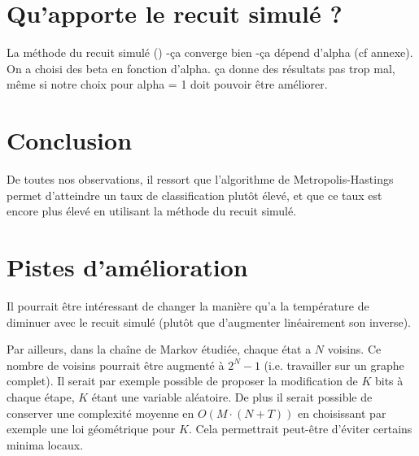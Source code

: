\documentclass[twocolumn]{article}
\begin{document}
	\section{Qu'apporte le recuit simulé ?}
		La méthode du recuit simulé ()
		-ça converge bien
		-ça dépend d'alpha (cf annexe). On a choisi des beta en fonction d'alpha. ça donne des résultats pas trop mal, même si notre choix pour alpha = 1 doit pouvoir être améliorer.
		
	\section{Conclusion}
		De toutes nos observations, il ressort que l'algorithme de Metropolis-Hastings permet d'atteindre un taux de classification plutôt élevé, et que ce taux est encore plus élevé en utilisant la méthode du recuit simulé.
		
	\section{Pistes d'amélioration}
		Il pourrait être intéressant de changer la manière qu'a la température de diminuer avec le recuit simulé (plutôt que d'augmenter linéairement son inverse).
		
		Par ailleurs, dans la chaîne de Markov étudiée, chaque état a $N$ voisins. Ce nombre de voisins pourrait être augmenté à $2^N-1$ (i.e. travailler sur un graphe complet). Il serait par exemple possible de proposer la modification de $K$ bits à chaque étape, $K$ étant une variable aléatoire. De plus il serait possible de conserver une complexité moyenne en $O(M\cdot(N+T))$ en choisissant par exemple une loi géométrique pour $K$.
		Cela permettrait peut-être d'éviter certains minima locaux.
		
		
\end{document}
